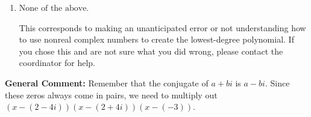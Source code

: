 \documentclass{extbook}[14pt]
\begin{document}
\begin{enumerate}
{\begin{enumerate}[label=\Alph*.]
$x^{3} + x^{2} +7 x + 12$, which corresponds to multiplying out $(x + 4)(x + 3)$.
\item \( \text{None of the above.} \)

This corresponds to making an unanticipated error or not understanding how to use nonreal complex numbers to create the lowest-degree polynomial. If you chose this and are not sure what you did wrong, please contact the coordinator for help.
\end{enumerate}

\textbf{General Comment:} Remember that the conjugate of $a+bi$ is $a-bi$. Since these zeros always come in pairs, we need to multiply out $(x-(2 - 4 i))(x-(2 + 4 i))(x-(-3))$.
}
\end{enumerate}
\end{document}
